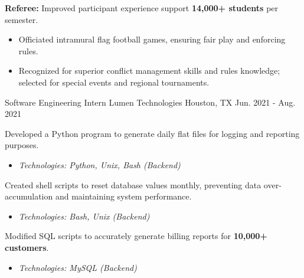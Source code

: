 \begin{cventries}
{\begin{cvitems}
{\begin{itemize}
      \end{itemize}
      }
      \item{
      \textbf{Referee:} Improved participant experience support \textbf{14,000+ students} per semester.
      \begin{itemize}
      \item Officiated intramural flag football games, ensuring fair play and enforcing rules.
      \item Recognized for superior conflict management skills and rules knowledge; selected for special events and regional tournaments.
      \end{itemize}
      }
    \end{cvitems}
  }
  \cventry
    {Software Engineering Intern} %
    {Lumen Technologies} %
    {Houston, TX} %
    {Jun. 2021 - Aug. 2021} %
    {
      \begin{cvitems} %
      \item {Developed a Python program to generate daily flat files for logging and reporting purposes.
      \begin{itemize}
      \item \textit{Technologies: Python, Unix, Bash (Backend)}
      \end{itemize}
      }
      \item{Created shell scripts to reset database values monthly, preventing data over-accumulation and maintaining system performance.
      \begin{itemize}
      \item \textit{Technologies: Bash, Unix (Backend)}
      \end{itemize}
      }
      \item {Modified SQL scripts to accurately generate billing reports for \textbf{10,000+ customers}.
      \begin{itemize}
      \item \textit{Technologies: MySQL (Backend)}
      \end{itemize}
      }
      \end{cvitems}
    }
\end{cventries}

